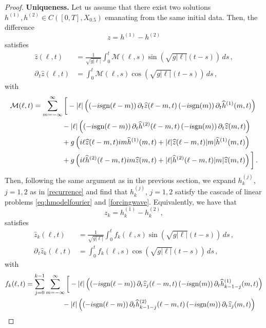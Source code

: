 \documentclass[11pt]{article}
\theoremstyle{plain}
\theoremstyle{definition}
\theoremstyle{definition}
\def\p{\text{\bf\emph{p}}}
\def\ft #1{{\widehat{#1}}}
\def\p{{\partial\hspace{1pt}}}
\begin{document}
\begin{proof}
\textbf{Uniqueness.} Let us assume that there exist two solutions $h^{(1)},h^{(2)}\in C([0,T],X_{0.5})$ emanating from the same initial data. Then, the difference
$$
z=h^{(1)}-h^{(2)}
$$
satisfies
\begin{align*}
\ft{z}(\ell,t) &= \frac{1}{\sqrt{g |\ell|}} \int_0^t \mathcal{M}(\ell,s) \sin\left( \sqrt{g|\ell|} (t-s)\right) \,ds \,,\\
\p_{\!t} \ft{z}(\ell,t) &= \int_0^t \mathcal{M}(\ell,s) \cos\left( \sqrt{g|\ell|} (t-s)\right) \,ds\,,
\end{align*}
with
\begin{align*}
\mathcal{M}(\ell,t) &= \sum_{m=-\infty}^{\infty}\bigg{[}-|\ell|\left(\left(-i\text{sgn}(\ell-m)\right)\p_{\!t}\ft{z}(\ell-m,t)\left(-i\text{sgn}(m)\right)\p_{\!t}\ft{h}^{(1)}(m,t)\right)\nonumber\\
&\qquad\qquad-|\ell|\left(\left(-i\text{sgn}(\ell-m)\right)\p_{\!t}\ft{h}^{(2)}(\ell-m,t)\left(-i\text{sgn}(m)\right)\p_{\!t}\ft{z}(m,t)\right)\nonumber\\
&\qquad\qquad+g\left( i\ell\ft{z}(\ell-m,t)im \ft{h}^{(1)}(m,t) +
|\ell|\ft{z}(\ell-m,t)|m|\ft{h}^{(1)}(m,t) \right)\nonumber\\
&\qquad\qquad+g\left( i\ell\ft{h}^{(2)}(\ell-m,t)im \ft{z}(m,t) +
|\ell|\ft{h}^{(2)}(\ell-m,t)|m|\ft{z}(m,t) \right) \bigg{]}\,.
\end{align*}
Then, following the same argument as in the previous section, we expand $h^{(j)}_k$, $j=1,2$ as in \eqref{recurrence} and find that $h^{(j)}_k$, $j=1,2$ satisfy the cascade of linear problems \eqref{eq:hmodelfourier} and \eqref{forcingwave}. Equivalently, we have that
$$
z_k=h^{(1)}_k-h^{(2)}_k,
$$
satisfies
\begin{align*}
\ft{z}_k(\ell,t) &= \frac{1}{\sqrt{g |\ell|}} \int_0^t f_k(\ell,s) \sin\left( \sqrt{g|\ell|} (t-s)\right) \,ds \,,\\
\p_{\!t} \ft{z}_k(\ell,t) &= \int_0^t f_k(\ell,s) \cos\left( \sqrt{g|\ell|} (t-s)\right) \,ds\,,
\end{align*}
with
\begin{align*}
f_k(\ell,t) &= \sum_{j=0}^{k-1}\sum_{m=-\infty}^{\infty}\bigg{[}-|\ell|\left(\left(-i\text{sgn}(\ell-m)\right)\p_{\!t}\ft{z}_j(\ell-m,t)\left(-i\text{sgn}(m)\right)\p_{\!t}\ft{h}^{(1)}_{k-1-j}(m,t)\right)\nonumber\\
&\qquad\qquad\quad\ -|\ell|\left(\left(-i\text{sgn}(\ell-m)\right)\p_{\!t}\ft{h}^{(2)}_{k-1-j}(\ell-m,t)\left(-i\text{sgn}(m)\right)\p_{\!t}\ft{z}_j(m,t)\right)\nonumber\\

\end{align*}
\end{proof}
\end{document}

